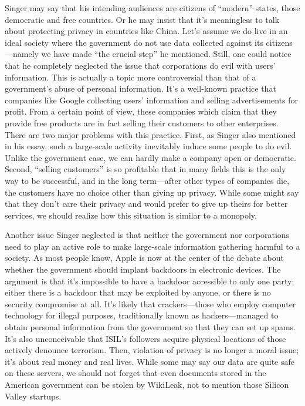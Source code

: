 \documentclass{writing}
\begin{document}
Singer may say that his intending audiences are citizens of ``modern''
states, those democratic and free countries. Or he may insist that it's
meaningless to talk about protecting privacy in countries like China.
Let's assume we do live in an ideal society where the government do not
use data collected against its citizens---namely we have made ``the
crucial step'' he mentioned. Still, one could notice that he completely
neglected the issue that corporations do evil with users' information.
This is actually a topic more controversial than that of a government's
abuse of personal information. It's a well-known practice that companies
like Google collecting users' information and selling advertisements for
profit. From a certain point of view, these companies which claim that
they provide free products are in fact selling their customers to other
enterprises. There are two major problems with this practice. First, as
Singer also mentioned in his essay, such a large-scale activity
inevitably induce some people to do evil. Unlike the government case, we
can hardly make a company open or democratic. Second, ``selling
customers'' is so profitable that in many fields this is the only way to
be successful, and in the long term---after other types of companies
die, the customers have no choice other than giving up privacy. While
some might say that they don't care their privacy and would prefer to
give up theirs for better services, we should realize how this situation
is similar to a monopoly.

Another issue Singer neglected is that neither the government nor
corporations need to play an active role to make large-scale information
gathering harmful to a society. As most people know, Apple is now at the
center of the debate about whether the government should implant
backdoors in electronic devices. The argument is that it's impossible to
have a backdoor accessible to only one party; either there is a backdoor
that may be exploited by anyone, or there is no security compromise at
all. It's likely that crackers---those who employ computer technology
for illegal purposes, traditionally known as hackers---managed to obtain
personal information from the government so that they can set up spams.
It's also unconceivable that ISIL's followers acquire physical locations
of those actively denounce terrorism. Then, violation of privacy is no
longer a moral issue; it's about real money and real lives. While some
may say our data are quite safe on these servers, we should not forget
that even documents stored in the American government can be stolen by
WikiLeak, not to mention those Silicon Valley startups.
\end{document}
